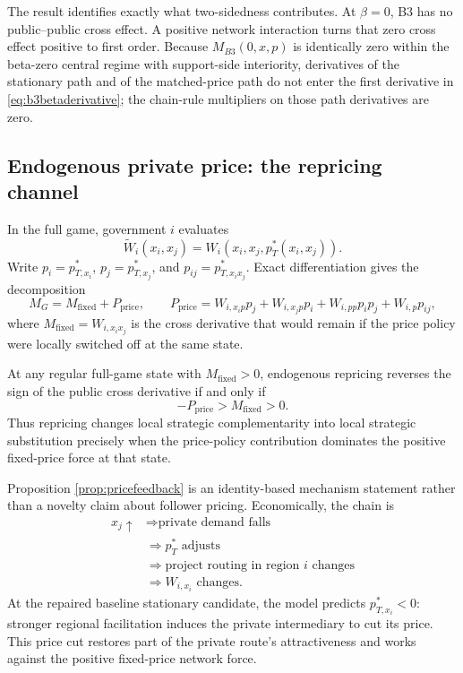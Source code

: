 The result identifies exactly what two-sidedness contributes. At $\beta=0$, B3 has no public--public cross effect. A positive network interaction turns that zero cross effect positive to first order. Because $M_{B3}(0,x,p)$ is identically zero within the beta-zero central regime with support-side interiority, derivatives of the stationary path and of the matched-price path do not enter the first derivative in \eqref{eq:b3betaderivative}; the chain-rule multipliers on those path derivatives are zero.

\subsection{Endogenous private price: the repricing channel}

In the full game, government $i$ evaluates
\[
\widetilde W_i(x_i,x_j)
=
W_i(x_i,x_j,p_T^*(x_i,x_j)).
\]
Write $p_i=p^*_{T,x_i}$, $p_j=p^*_{T,x_j}$, and $p_{ij}=p^*_{T,x_ix_j}$. Exact differentiation gives the decomposition
\begin{equation}
M_G
=
M_{\mathrm{fixed}}
+
P_{\mathrm{price}},
\qquad
P_{\mathrm{price}}
=
W_{i,x_ip}p_j+W_{i,x_jp}p_i+W_{i,pp}p_ip_j+W_{i,p}p_{ij},
\label{eq:repricingdecomposition}
\end{equation}
where $M_{\mathrm{fixed}}=W_{i,x_ix_j}$ is the cross derivative that would remain if the price policy were locally switched off at the same state.

\begin{proposition}\label{prop:pricefeedback}
At any regular full-game state with $M_{\mathrm{fixed}}>0$, endogenous repricing reverses the sign of the public cross derivative if and only if
\[
-P_{\mathrm{price}}>M_{\mathrm{fixed}}>0.
\]
Thus repricing changes local strategic complementarity into local strategic substitution precisely when the price-policy contribution dominates the positive fixed-price force at that state.
\end{proposition}

Proposition \ref{prop:pricefeedback} is an identity-based mechanism statement rather than a novelty claim about follower pricing. Economically, the chain is
\[
\begin{aligned}
x_j\uparrow
&\Longrightarrow \text{private demand falls}\\
&\Longrightarrow p_T^*\text{ adjusts}\\
&\Longrightarrow \text{project routing in region }i\text{ changes}\\
&\Longrightarrow W_{i,x_i}\text{ changes}.
\end{aligned}
\]
At the repaired baseline stationary candidate, the model predicts $p^*_{T,x_i}<0$: stronger regional facilitation induces the private intermediary to cut its price. This price cut restores part of the private route's attractiveness and works against the positive fixed-price network force.

